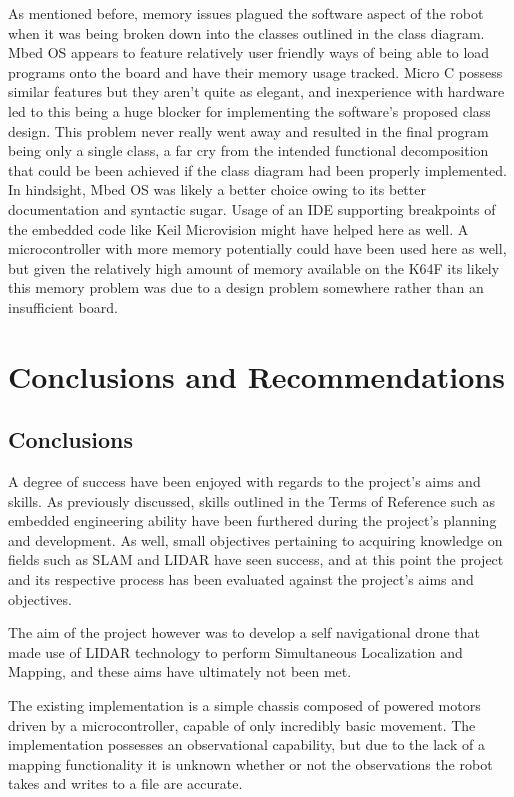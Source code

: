 		As mentioned before, memory issues plagued the software aspect of the robot when it was being broken down into the classes outlined in the class diagram. Mbed OS appears to feature relatively user friendly ways of being able to load programs onto the board and have their memory usage tracked. Micro C possess similar features but they aren't quite as elegant, and inexperience with hardware led to this being a huge blocker for implementing the software's proposed class design. This problem never really went away and resulted in the final program being only a single class, a far cry from the intended functional decomposition that could be been achieved if the class diagram had been properly implemented. In hindsight, Mbed OS was likely a better choice owing to its better documentation and syntactic sugar. Usage of an IDE supporting breakpoints of the embedded code like Keil Microvision might have helped here as well. A microcontroller with more memory potentially could have been used here as well, but given the relatively high amount of memory available on the K64F its likely this memory problem was due to a design problem somewhere rather than an insufficient board.
	
	\chapter{Conclusions and Recommendations}
		\section{Conclusions}	
		A degree of success have been enjoyed with regards to the project's aims and skills. As previously discussed, skills outlined in the Terms of Reference such as embedded engineering ability have been furthered during the project's planning and development. As well, small objectives pertaining to acquiring knowledge on fields such as SLAM and LIDAR have seen success, and at this point the project and its respective process has been evaluated against the project's aims and objectives.
		
		The aim of the project however was to develop a self navigational drone that made use of LIDAR technology to perform Simultaneous Localization and Mapping, and these aims have ultimately not been met.
		
		The existing implementation is a simple chassis composed of powered motors driven by a microcontroller, capable of only incredibly basic movement. The implementation possesses an observational capability, but due to the lack of a mapping functionality it is unknown whether or not the observations the robot takes and writes to a file are accurate.
		
		
